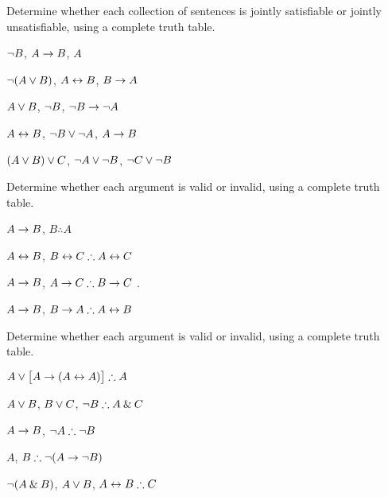 \noindent\problempart
\label{pr.TT.satisfiable3}
Determine whether each collection of sentences is jointly satisfiable or jointly unsatisfiable, using a complete truth table. 
\begin{earg}
\item $\neg B$, $A \rightarrow B$, $A$ \vspace{.5ex} \hfill {}
\item $\neg(A \vee B)$, $A \leftrightarrow B$, $B \rightarrow A$\vspace{.5ex} \hfill {}
\item $A \vee B$, $\neg B$, $\neg B \rightarrow \neg A$\vspace{.5ex} \hfill {}
\item $A \leftrightarrow B$, $\neg B \vee \neg A$, $A \rightarrow B$\vspace{.5ex} \hfill {} 
\item $(A \vee B) \vee C$, $\neg A \vee \neg B$, $\neg C \vee \neg B$\vspace{.5ex} \hfill {}
\end{earg}

\noindent\problempart
\label{pr.TT.valid2}
Determine whether each argument is valid or invalid, using a complete truth table. 
\begin{earg}
\item $A\rightarrow B$, $B \therefore  A$ \hfill {}

\item $A\leftrightarrow B$, $B\eiff C \therefore A\eiff C$ \hfill {}

\item $A \rightarrow B$, $A \eif C\therefore B \eif C$ \hfill {}. 

\item $A \rightarrow B$, $B \eif A\therefore A \eiff B$ \hfill {} 
\end{earg}

\noindent\problempart
\label{pr.TT.valid3}
Determine whether each argument is valid or invalid, using a complete truth table. 
\begin{earg}
\item $A\eor\bigl[A\eif(A\eiff A)\bigr] \therefore  A $\vspace{.5ex} \hfill {}
\item $A\vee B$, $B\vee C$, $\enot B \therefore A \eand C$\vspace{.5ex} \hfill {}
\item $A \rightarrow B$, $\enot A\therefore \enot B$ \vspace{.5ex} \hfill {}
\item $A$, $B\therefore \enot(A\eif \enot B)$ \vspace{.5ex} \hfill {}
\item $\neg(A \mathbin{\&} B)$, $A \vee B$, $A \eiff B\therefore C$ \vspace{.5ex} \hfill {}
\end{earg}

